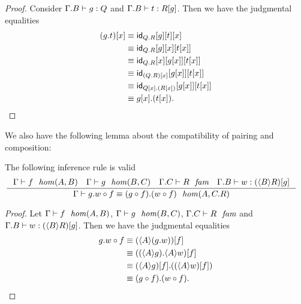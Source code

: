 \begin{proof}
Consider $\jterm{{\Gamma}{B}}{Q}{g}$ and $\jterm{{\Gamma}{B}}{\subst{g}{R}}{t}$.
Then we have the judgmental equalities
\begin{align*}
\subst{x}{\tmext{Q}{R}{g}{t}}
& \jdeq \subst{x}{{t}{{g}{\idfunc[\ctxext{Q}{R}]}}}\\
& \jdeq \subst{{x}{t}}{{x}{{g}{\idfunc[\ctxext{Q}{R}]}}}\\
& \jdeq \subst{{x}{t}}{{{x}{g}}{{x}{\idfunc[\ctxext{Q}{R}]}}}\\
& \jdeq \subst{{x}{t}}{{{x}{g}}{\idfunc[\subst{x}{\ctxext{Q}{R}}]}}\\
& \jdeq \subst{{x}{t}}{{{x}{g}}{\idfunc[\ctxext{\subst{x}{Q}}{\subst{x}{R}}]}}\\
& \jdeq \tmext{\subst{x}{Q}}{\subst{x}{R}}{\subst{x}{g}}{\subst{x}{t}}.
\end{align*}
\end{proof}

We also have the following lemma about the compatibility of pairing and composition:

\begin{lem}
The following inference rule is valid
\begin{align*}
& \inference
  {\jhom{\Gamma}{A}{B}{f}
   \jhom{\Gamma}{B}{C}{g}
   \jfam{{\Gamma}{C}}{R}
   \jterm{{\Gamma}{B}}{\subst{g}{\ctxwk{B}{R}}}{w}}
  {\jhomeq{\Gamma}{A}{{C}{R}}
    {\jcomp{A}{f}{\tmext{\ctxwk{B}{C}}{\ctxwk{B}{R}}{g}{w}}}
    {\tmext{\ctxwk{A}{C}}{\ctxwk{A}{R}}{\jcomp{A}{f}{g}}{\jcomp{A}{f}{w}}}}
\end{align*}
\end{lem}

\begin{proof}
Let $\jhom{\Gamma}{A}{B}{f}$, $\jhom{\Gamma}{B}{C}{g}$, $\jfam{{\Gamma}{C}}{R}$
and $\jterm{{\Gamma}{B}}{\subst{g}{\ctxwk{B}{R}}}{w}$. Then we have the
judgmental equalities
\begin{align*}
\jcomp{A}{f}{\tmext{\ctxwk{B}{C}}{\ctxwk{B}{R}}{g}{w}}
& \jdeq \subst{f}{\ctxwk{A}{\tmext{\ctxwk{B}{C}}{\ctxwk{B}{R}}{g}{w}}}\\
& \jdeq \subst{f}{\tmext{\ctxwk{A}{{B}{C}}}{\ctxwk{A}{{B}{R}}}{\ctxwk{A}{g}}{\ctxwk{A}{w}}}\\
& \jdeq \tmext{\ctxwk{A}{C}}{\ctxwk{A}{R}}{\subst{f}{\ctxwk{A}{g}}}{\subst{f}{\ctxwk{A}{w}}}\\
& \jdeq \tmext{\ctxwk{A}{C}}{\ctxwk{A}{R}}{\jcomp{A}{f}{g}}{\jcomp{A}{f}{w}}.
\end{align*}
\end{proof}
%

